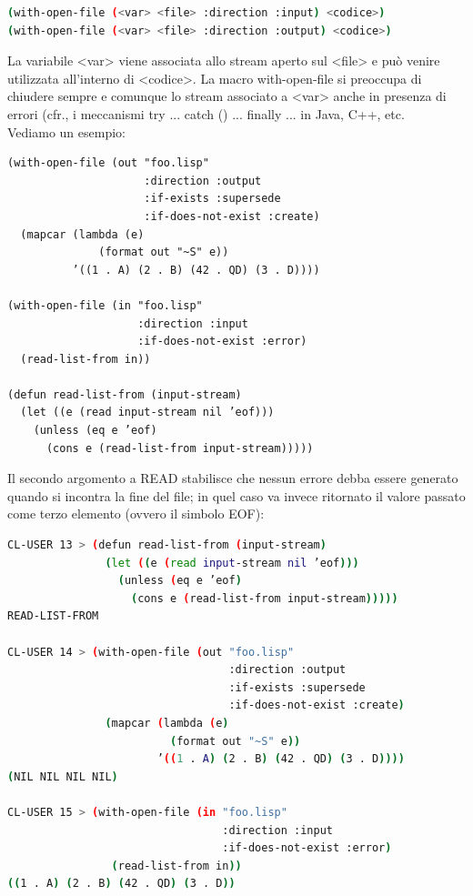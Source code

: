 \documentclass[a4paper,12pt, oneside]{book}
\begin{document}
\begin{shaded}
\begin{lstlisting}[language=bash]
(with-open-file (<var> <file> :direction :input) <codice>)
(with-open-file (<var> <file> :direction :output) <codice>)
\end{lstlisting}
\end{shaded}
La variabile <var> viene associata allo stream aperto sul <file> e può venire
utilizzata all’interno di <codice>. La macro with-open-file si preoccupa di chiudere sempre e comunque lo
stream associato a <var> anche in presenza di errori (cfr., i meccanismi try
{...} catch () {...} finally {...} in Java, C++, etc. \\
Vediamo un esempio:
\begin{verbatim}
(with-open-file (out "foo.lisp"
                     :direction :output
                     :if-exists :supersede
                     :if-does-not-exist :create)
  (mapcar (lambda (e)
              (format out "~S" e))
          ’((1 . A) (2 . B) (42 . QD) (3 . D))))
          
(with-open-file (in "foo.lisp"
                    :direction :input
                    :if-does-not-exist :error)
  (read-list-from in))
  
(defun read-list-from (input-stream)
  (let ((e (read input-stream nil ’eof)))
    (unless (eq e ’eof)
      (cons e (read-list-from input-stream)))))
\end{verbatim}
Il secondo argomento a READ stabilisce che nessun errore debba essere generato quando
si incontra la fine del file; in quel caso va invece ritornato il valore passato come terzo
elemento (ovvero il simbolo EOF):
\begin{shaded}
\begin{lstlisting}[language=bash]
CL-USER 13 > (defun read-list-from (input-stream)
               (let ((e (read input-stream nil ’eof)))
                 (unless (eq e ’eof)
                   (cons e (read-list-from input-stream)))))
READ-LIST-FROM

CL-USER 14 > (with-open-file (out "foo.lisp"
                                  :direction :output
                                  :if-exists :supersede
                                  :if-does-not-exist :create)
               (mapcar (lambda (e)
                         (format out "~S" e))
                       ’((1 . A) (2 . B) (42 . QD) (3 . D))))
(NIL NIL NIL NIL)

CL-USER 15 > (with-open-file (in "foo.lisp"
                                 :direction :input
                                 :if-does-not-exist :error)
                (read-list-from in))
((1 . A) (2 . B) (42 . QD) (3 . D))
\end{lstlisting}
\end{shaded}
\end{document}
